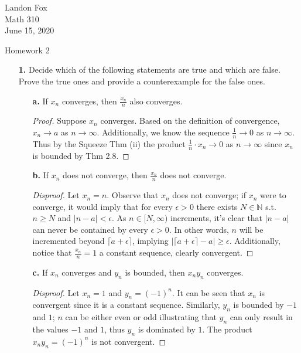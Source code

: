 \documentclass[ 12pt ]{article}
\begin{document}
\noindent Landon Fox \\
\noindent Math 310 \\
\noindent June 15, 2020

\begin{center}
\Large Homework 2
\end{center}

\begin{enumerate}
	\item[\textbf{1.}] Decide which of the following statements are true and
	which are false. Prove the true ones and provide a counterexample for the
	false ones.

	\begin{enumerate}
		\item[\textbf{a.}] If $x_n$ converges, then $\frac{x_n}{n}$ also
		converges.

		\begin{proof}
			Suppose $x_n$ converges. Based on the definition of convergence,
			$x_n \rightarrow a$ as $n \rightarrow \infty$. Additionally,
			we know the sequence $\frac{1}{n} \rightarrow 0$ as
			$n \rightarrow \infty$. Thus by the Squeeze Thm (ii) the product
			$\frac{1}{n} \cdot x_n \rightarrow 0$ as $n \rightarrow \infty$
			since $x_n$ is bounded by Thm 2.8.
		\end{proof}


		\item[\textbf{b.}] If $x_n$ does not converge, then $\frac{x_n}{n}$ does
		not converge.

		\begin{proof}[Disproof]
			Let $x_n = n$. Observe that $x_n$ does not converge; if $x_n$ were
			to converge, it would imply that for every $\epsilon > 0$ there
			exists $N \in \mathbb{N}$ s.t. $n \geq N$ and $|n-a| < \epsilon$.
			As $n \in [N, \infty)$ increments, it's clear that $|n-a|$ can never
			be contained by every $\epsilon > 0$. In other words, $n$ will be
			incremented beyond $\lceil a + \epsilon \rceil$, implying
			$|\lceil a + \epsilon \rceil-a| \geq \epsilon$. Additionally, notice
			that $\frac{x_n}{n} = 1$ a constant sequence, clearly convergent.
		\end{proof}


		\item[\textbf{c.}] If $x_n$ converges and $y_n$ is bounded, then
		$x_n y_n$ converges.

		\begin{proof}[Disproof]
			Let $x_n = 1$ and $y_n = (-1)^n$. It can be seen that $x_n$ is
			convergent since it is a constant sequence. Similarly, $y_n$ is
			bounded by $-1$ and $1$; $n$ can be either even or odd illustrating
			that $y_n$ can only result in the values $-1$ and $1$, thus
			$y_n$ is dominated by $1$. The product $x_n y_n = (-1)^n$ is not
			convergent.
		\end{proof}



\end{enumerate}
\end{enumerate}
\end{document}
